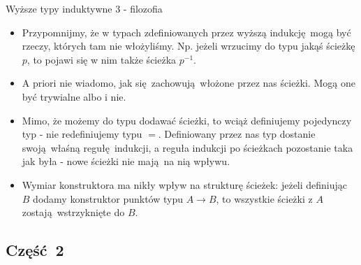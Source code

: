 \documentclass{beamer}
\begin{document}
\begin{frame}{Wyższe typy induktywne 3 - filozofia}
\begin{itemize}
	\item Przypomnijmy, że w typach zdefiniowanych przez wyższą indukcję mogą być rzeczy, których tam nie włożyliśmy. Np. jeżeli wrzucimy do typu jakąś ścieżkę $p$, to pojawi się w nim także ścieżka $p^{-1}$.
	\item A priori nie wiadomo, jak się zachowują włożone przez nas ścieżki. Mogą one być trywialne albo i nie.
	\item Mimo, że możemy do typu dodawać ścieżki, to wciąż definiujemy pojedynczy typ - nie redefiniujemy typu $=$. Definiowany przez nas typ dostanie swoją właśną regułę indukcji, a reguła indukcji po ścieżkach pozostanie taka jak była - nowe ścieżki nie mają na nią wpływu.
	\item Wymiar konstruktora ma nikły wpływ na strukturę ścieżek: jeżeli definiując $B$ dodamy konstruktor punktów typu $A \to B$, to wszystkie ścieżki z $A$ zostają wstrzyknięte do $B$.
\end{itemize}
\end{frame}

\subsection{Część 2}
\end{document}
